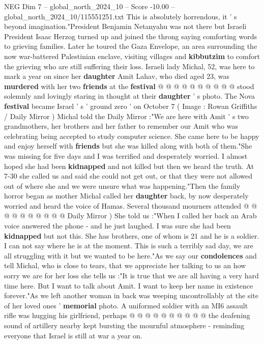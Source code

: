 \begin{textsample}{NEG Dim 7 – global\_north\_2024\_10 – Score -10.00 – global\_north\_2024\_10/115551251.txt}
This is absolutely horrendous, it ' s beyond imagination."President Benjamin Netanyahu was not there but Israeli President Isaac Herzog turned up and joined the throng saying comforting words to grieving families.
Later he toured the Gaza Envelope, an area surrounding the now war-battered Palestinian enclave, visiting villages and \textbf{kibbutzim} to comfort the grieving who are still suffering their loss.
Israeli lady Michal, 52, was here to mark a year on since her \textbf{daughter} Amit Lahav, who died aged 23, was \textbf{murdered} with her two \textbf{friends} at the \textbf{festival} @ @ @ @ @ @ @ @ @ @ stood solemnly and lovingly staring in thought at their \textbf{daughter} ' s photo.
The Nova \textbf{festival} became Israel ' s ' ground zero ' on October 7 ( Image : Rowan Griffiths / Daily Mirror ) Michal told the Daily Mirror :"We are here with Amit ' s two grandmothers, her brothers and her father to remember our Amit who was celebrating being accepted to study computer science.
She came here to be happy and enjoy herself with \textbf{friends} but she was killed along with both of them."She was missing for five days and I was terrified and desperately worried.
I almost hoped she had been \textbf{kidnapped} and not killed but then we heard the truth.
At 7-30 she called us and said she could not get out, or that they were not allowed out of where she and we were unsure what was happening."Then the family horror began as mother Michal called her \textbf{daughter} back, by now desperately worried and heard the voice of Hamas.
Several thousand mourners attended @ @ @ @ @ @ @ @ @ @ Daily Mirror ) She told us :"When I called her back an Arab voice answered the phone - and he just laughed.
I was sure she had been \textbf{kidnapped} but not this.
She has brothers, one of whom is 21 and he is a soldier.
I can not say where he is at the moment.
This is such a terribly sad day, we are all struggling with it but we wanted to be here."As we say our \textbf{condolences} and tell Michal, who is close to tears, that we appreciate her talking to us an how sorry we are for her loss she tells us :"It is true that we are all having a very hard time here.
But I want to talk about Amit.
I want to keep her name in existence forever."As we left another woman in back was weeping uncontrollably at the site of her loved ones ' \textbf{memorial} photo.
A uniformed soldier with an MI6 assault rifle was hugging his girlfriend, perhaps @ @ @ @ @ @ @ @ @ @ the deafening sound of artillery nearby kept bursting the mournful atmosphere - reminding everyone that Israel is still at war a year on.

\end{textsample}

